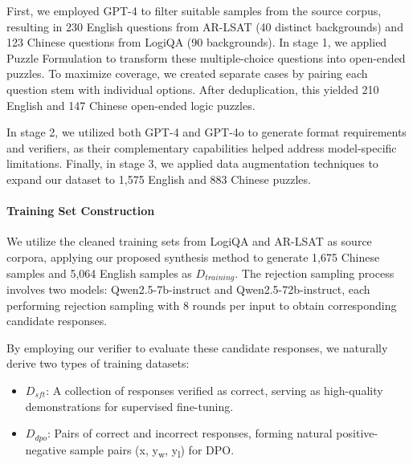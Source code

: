 First, we employed GPT-4 to filter suitable samples from the source corpus, resulting in 230 English questions from AR-LSAT (40 distinct backgrounds) and 123 Chinese questions from LogiQA (90 backgrounds). In stage 1, we applied Puzzle Formulation to transform these multiple-choice questions into open-ended puzzles. To maximize coverage, we created separate cases by pairing each question stem with individual options. After deduplication, this yielded 210 English and 147 Chinese open-ended logic puzzles.

In stage 2, we utilized both GPT-4 and GPT-4o to generate format requirements and verifiers, as their complementary capabilities helped address model-specific limitations. %
Finally, in stage 3, we applied data augmentation techniques to expand our dataset to 1,575 English and 883 Chinese puzzles.






\paragraph{Training Set Construction}

We utilize the cleaned training sets from LogiQA and AR-LSAT as source corpora, applying our proposed synthesis method to generate 1,675 Chinese samples and 5,064 English samples as $D_{training}$. The rejection sampling process involves two models: Qwen2.5-7b-instruct and Qwen2.5-72b-instruct, each performing rejection sampling with 8 rounds per input to obtain corresponding candidate responses.

By employing our verifier to evaluate these candidate responses, we naturally derive two types of training datasets:
\begin{itemize}
    \item $D_{sft}$: A collection of responses verified as correct, serving as high-quality demonstrations for supervised fine-tuning.
    \item $D_{dpo}$: Pairs of correct and incorrect responses, forming natural positive-negative sample pairs (x, y\textsubscript{w}, y\textsubscript{l}) for DPO.
\end{itemize}

